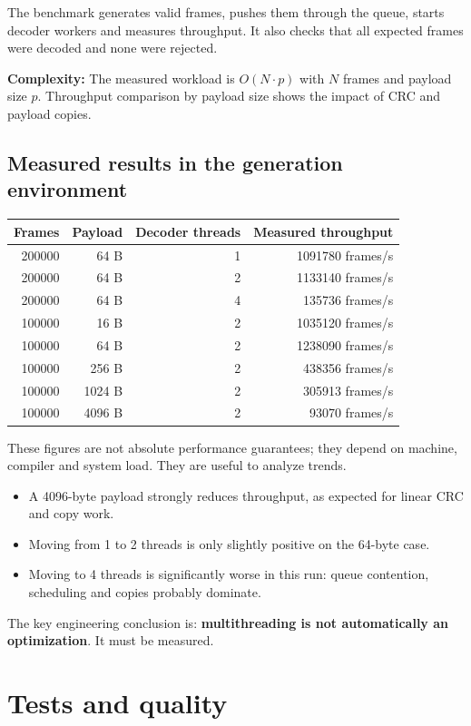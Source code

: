 \documentclass[10pt,a4paper]{article}
\newcommand{\complexity}[1]{\textbf{Complexity:} #1}
\begin{document}
The benchmark generates valid frames, pushes them through the queue, starts decoder workers and measures throughput. It also checks that all expected frames were decoded and none were rejected.

\complexity{The measured workload is $O(N \cdot p)$ with $N$ frames and payload size $p$. Throughput comparison by payload size shows the impact of CRC and payload copies.}

\subsection{Measured results in the generation environment}

\begin{longtable}{@{}rrrr@{}}
\toprule
Frames & Payload & Decoder threads & Measured throughput \\
\midrule
200000 & 64 B & 1 & 1091780 frames/s \\
200000 & 64 B & 2 & 1133140 frames/s \\
200000 & 64 B & 4 & 135736 frames/s \\
100000 & 16 B & 2 & 1035120 frames/s \\
100000 & 64 B & 2 & 1238090 frames/s \\
100000 & 256 B & 2 & 438356 frames/s \\
100000 & 1024 B & 2 & 305913 frames/s \\
100000 & 4096 B & 2 & 93070 frames/s \\
\bottomrule
\end{longtable}


These figures are not absolute performance guarantees; they depend on machine, compiler and system load. They are useful to analyze trends.

\begin{itemize}
  \item A 4096-byte payload strongly reduces throughput, as expected for linear CRC and copy work.
  \item Moving from 1 to 2 threads is only slightly positive on the 64-byte case.
  \item Moving to 4 threads is significantly worse in this run: queue contention, scheduling and copies probably dominate.
\end{itemize}

The key engineering conclusion is: \textbf{multithreading is not automatically an optimization}. It must be measured.

\section{Tests and quality}
\end{document}
